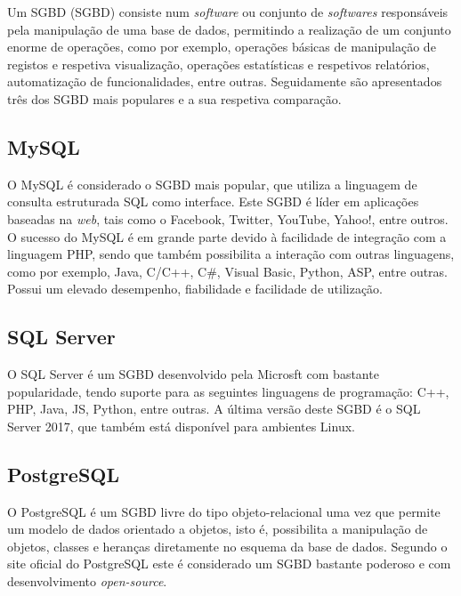 Um \acl{SGBD} (\acs{SGBD}) consiste num \textit{software} ou conjunto de \textit{softwares} responsáveis pela manipulação de uma base de dados, permitindo a realização de um conjunto enorme de operações, como por exemplo, operações básicas de manipulação de registos e respetiva visualização, operações estatísticas e respetivos relatórios, automatização de funcionalidades, entre outras. Seguidamente são apresentados três dos \ac{SGBD} mais populares e a sua respetiva comparação. 


\subsection{MySQL}


O MySQL é considerado o \ac{SGBD} mais popular, que utiliza a linguagem de consulta estruturada \ac{SQL} como interface. Este \ac{SGBD} é líder em aplicações baseadas na \textit{web}, tais como o Facebook, Twitter, YouTube, Yahoo!, entre outros. O sucesso do MySQL é em grande parte devido à facilidade de  integração com a linguagem PHP, sendo que também possibilita a interação com outras linguagens, como por exemplo, Java, C/C++, C\#, Visual Basic, Python, ASP, entre outras. Possui um elevado desempenho, fiabilidade e facilidade de utilização\cite{MySQL2011}\cite{why-msql}.	


\subsection{SQL Server}

O SQL Server é um \ac{SGBD} desenvolvido pela Microsft com bastante popularidade, tendo suporte para as seguintes linguagens de programação: C++, PHP, Java, \ac{JS}, Python, entre outras. A última versão deste \ac{SGBD} é o SQL Server 2017, que também está disponível para ambientes Linux\cite{linuxsqlserver}.

\subsection{PostgreSQL}

O PostgreSQL é um \ac{SGBD} livre do tipo objeto-relacional uma vez que permite um modelo de dados orientado a objetos, isto é, possibilita a manipulação de objetos, classes e heranças diretamente no esquema da base de dados. Segundo o site oficial do PostgreSQL este é considerado um \ac{SGBD} bastante poderoso e com desenvolvimento \textit{open-source}\cite{ThePostgreSQLGlobalDevelopmentGroup2012}. 


